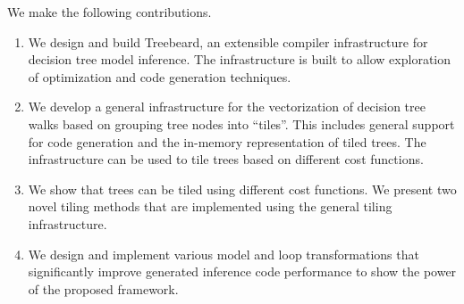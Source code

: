 We make the following contributions.
\begin{enumerate}
  \item We design and build Treebeard, an extensible compiler infrastructure for decision tree model inference. The 
  infrastructure is built to allow exploration of optimization and code generation techniques. 
  \item We develop a general infrastructure for the vectorization of decision tree walks based on grouping tree nodes into ``tiles''.
   This includes general support for code generation and the in-memory representation of tiled trees. The infrastructure can be 
   used to tile trees based on different cost functions.
  \item We show that trees can be tiled using different cost functions. We present two novel tiling methods that are implemented
  using the general tiling infrastructure. 
  \item We design and implement various model and loop transformations that significantly improve generated inference code performance 
  to show the power of the proposed framework.
\end{enumerate}


